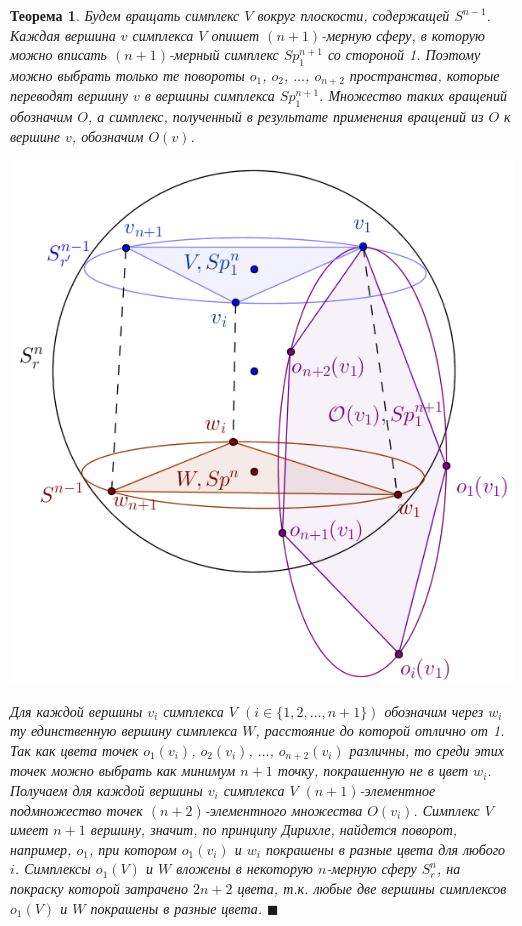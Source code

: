 \documentclass{report}%
\newtheorem{theorem}{Теорема}
\newenvironment{proof}{\par\noindent{\bf Доказательство.}}{\hfill$\scriptstyle\blacksquare$}
\begin{document}
\begin{theorem}
\begin{proof}
				Будем вращать симплекс $V$ вокруг плоскости, содержащей $S^{n-1}$.
				Каждая вершина $v$ симплекса $V$ опишет $(n+1)$-мерную сферу,
				в которую можно вписать $(n+1)$-мерный симплекс $Sp_1^{n+1}$ со стороной 1.
				Поэтому можно выбрать только те повороты $o_1$, $o_2$, $\ldots$, $o_{n+2}$ пространства,
				которые переводят вершину $v$ в вершины симплекса $Sp_1^{n+1}$.
				Множество таких вращений обозначим $O$, а симплекс, полученный в результате применения вращений из $O$ к вершине $v$, обозначим $O(v)$. \\
				\begin{center}
						\includegraphics[scale = 1]{sphere}
				\end{center}
				
				Для каждой вершины $v_i$ симплекса $V$ $( i \in \{1, 2, \ldots, n+1\})$ обозначим через $w_i$ ту единственную вершину симплекса $W$,
				расстояние до которой отлично от 1. Так как цвета точек $o_1(v_i)$, $o_2(v_i)$, $\ldots$, $o_{n+2}(v_i)$ различны,
				то среди этих точек можно выбрать как минимум $n+1$ точку, покрашенную не в цвет $w_i$.
				Получаем для каждой вершины $v_i$ симплекса $V$ $(n+1)$-элементное подмножество точек $(n+2)$-элементного множества $O(v_i)$.
				Симплекс $V$ имеет $n+1$ вершину, значит, по принципу Дирихле, найдется поворот, например, $o_1$,
				при котором $o_1(v_i)$ и $w_i$ покрашены в разные цвета для любого $i$.
				Симплексы $o_1(V)$ и $W$ вложены в некоторую $n$-мерную сферу $S_r^n$, на покраску которой затрачено $2n+2$ цвета,
				т.к. любые две вершины симплексов $o_1(V)$ и $W$ покрашены в разные цвета. 
		\end{proof}
\end{theorem}
\end{document}
